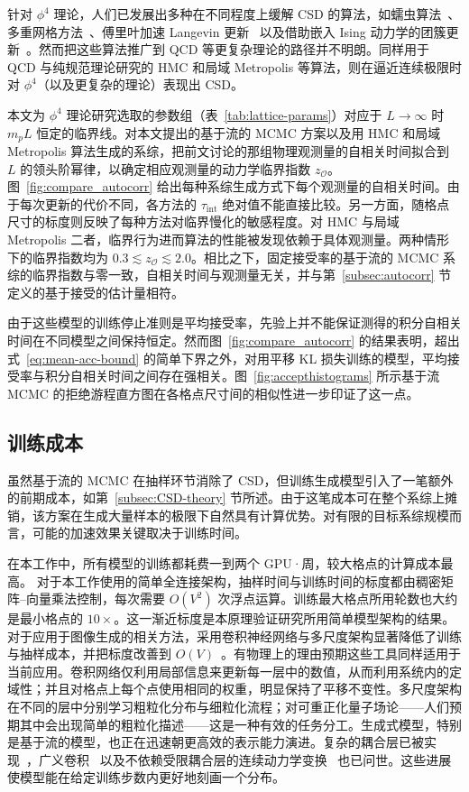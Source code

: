 针对 $\phi^4$ 理论，人们已发展出多种在不同程度上缓解 CSD 的算法，如蠕虫算法~\cite{vierhaus}、多重网格方法~\cite{GoodmanSokal89}、傅里叶加速 Langevin 更新~\cite{Batrouni87} 以及借助嵌入 Ising 动力学的团簇更新~\cite{BrowerTamayo89}。然而把这些算法推广到 QCD 等更复杂理论的路径并不明朗。同样用于 QCD 与纯规范理论研究的 HMC 和局域 Metropolis 等算法，则在逼近连续极限时对 $\phi^4$（以及更复杂的理论）表现出 CSD。

本文为 $\phi^4$ 理论研究选取的参数组（表~\ref{tab:lattice-params}）对应于 $L\rightarrow \infty$ 时 $m_pL$ 恒定的临界线。对本文提出的基于流的 MCMC 方案以及用 HMC 和局域 Metropolis 算法生成的系综，把前文讨论的那组物理观测量的自相关时间拟合到 $L$ 的领头阶幂律，以确定相应观测量的动力学临界指数 $z_\mathcal{O}$。
%
图~\ref{fig:compare_autocorr} 给出每种系综生成方式下每个观测量的自相关时间。由于每次更新的代价不同，各方法的 $\tau_\text{int}$ 绝对值不能直接比较。另一方面，随格点尺寸的标度则反映了每种方法对临界慢化的敏感程度。对 HMC 与局域 Metropolis 二者，临界行为进而算法的性能被发现依赖于具体观测量。两种情形下的临界指数均为 $0.3\lesssim z_\mathcal{O}\lesssim 2.0$。相比之下，固定接受率的基于流的 MCMC 系综的临界指数与零一致，自相关时间与观测量无关，并与第~\ref{subsec:autocorr} 节定义的基于接受的估计量相符。

由于这些模型的训练停止准则是平均接受率，先验上并不能保证测得的积分自相关时间在不同模型之间保持恒定。然而图~\ref{fig:compare_autocorr} 的结果表明，超出式~\eqref{eq:mean-acc-bound} 的简单下界之外，对用平移 KL 损失训练的模型，平均接受率与积分自相关时间之间存在强相关。图~\ref{fig:accepthistograms} 所示基于流 MCMC 的拒绝游程直方图在各格点尺寸间的相似性进一步印证了这一点。

\subsection{训练成本}
\label{subsec:training-cost}
虽然基于流的 MCMC 在抽样环节消除了 CSD，但训练生成模型引入了一笔额外的前期成本，如第~\ref{subsec:CSD-theory} 节所述。由于这笔成本可在整个系综上摊销，该方案在生成大量样本的极限下自然具有计算优势。对有限的目标系综规模而言，可能的加速效果关键取决于训练时间。

在本工作中，所有模型的训练都耗费一到两个 GPU·周，较大格点的计算成本最高。
对于本工作使用的简单全连接架构，抽样时间与训练时间的标度都由稠密矩阵--向量乘法控制，每次需要 $O(V^2)$ 次浮点运算。训练最大格点所用轮数也大约是最小格点的 $10\times$。这一渐近标度是本原理验证研究所用简单模型架构的结果。对于应用于图像生成的相关方法，采用卷积神经网络与多尺度架构显著降低了训练与抽样成本，并把标度改善到 $O(V)$~\cite{Dinh2016}。有物理上的理由预期这些工具同样适用于当前应用。卷积网络仅利用局部信息来更新每一层中的数值，从而利用系统内的定域性；并且对格点上每个点使用相同的权重，明显保持了平移不变性。多尺度架构在不同的层中分别学习粗粒化分布与细粒化流程；对可重正化量子场论——人们预期其中会出现简单的粗粒化描述——这是一种有效的任务分工。生成式模型，特别是基于流的模型，也正在迅速朝更高效的表示能力演进。复杂的耦合层已被实现~\cite{Dinh2015, Dinh2016}，广义卷积~\cite{Kingma2018, Hoogeboom2019} 以及不依赖受限耦合层的连续动力学变换~\cite{Grathwohl2019} 也已问世。这些进展使模型能在给定训练步数内更好地刻画一个分布。
%
%

